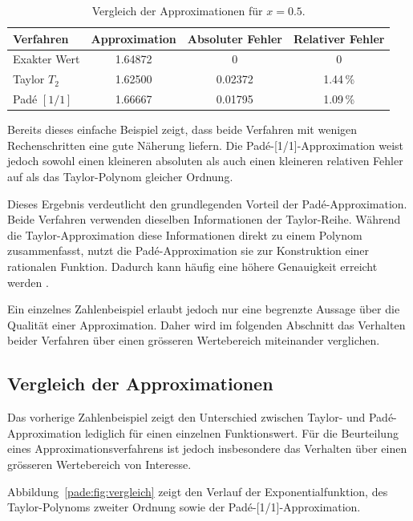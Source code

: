 \begin{table}
	\centering
	\begin{tabular}{lccc}
		\hline
		Verfahren & Approximation & Absoluter Fehler & Relativer Fehler\\
		\hline
		Exakter Wert & 1.64872 & 0\phantom{.00000} & 0\phantom{.00\,\%}\\
		Taylor \(T_2\) & 1.62500 & 0.02372 & 1.44\,\%\\
		Padé \([1/1]\) & 1.66667 & 0.01795 & 1.09\,\%\\
		\hline
	\end{tabular}
	\caption{Vergleich der Approximationen für \(x=0.5\).}
	\label{pade:tab:vergleich}
\end{table}

Bereits dieses einfache Beispiel zeigt, dass beide Verfahren mit wenigen Rechenschritten eine gute Näherung liefern. Die Padé-[1/1]-Approximation weist jedoch sowohl einen kleineren absoluten als auch einen kleineren relativen Fehler auf als das Taylor-Polynom gleicher Ordnung.

Dieses Ergebnis verdeutlicht den grundlegenden Vorteil der Padé-Approximation. Beide Verfahren verwenden dieselben Informationen der Taylor-Reihe. Während die Taylor-Approximation diese Informationen direkt zu einem Polynom zusammenfasst, nutzt die Padé-Approximation sie zur Konstruktion einer rationalen Funktion. Dadurch kann häufig eine höhere Genauigkeit erreicht werden \cite{baker_graves_morris_1996}.

Ein einzelnes Zahlenbeispiel erlaubt jedoch nur eine begrenzte Aussage über die Qualität einer Approximation. Daher wird im folgenden Abschnitt das Verhalten beider Verfahren über einen grösseren Wertebereich miteinander verglichen.

\subsection{Vergleich der Approximationen}
\label{pade:subsection:vergleich}

Das vorherige Zahlenbeispiel zeigt den Unterschied zwischen Taylor- und Padé-Appro\-xi\-ma\-tion lediglich für einen einzelnen Funktionswert. Für die Beurteilung eines Approximationsverfahrens ist jedoch insbesondere das Verhalten über einen grösseren Wertebereich von Interesse.

Abbildung~\ref{pade:fig:vergleich} zeigt den Verlauf der Exponentialfunktion, des Taylor-Polynoms zweiter Ordnung sowie der Padé-[1/1]-Approximation.

